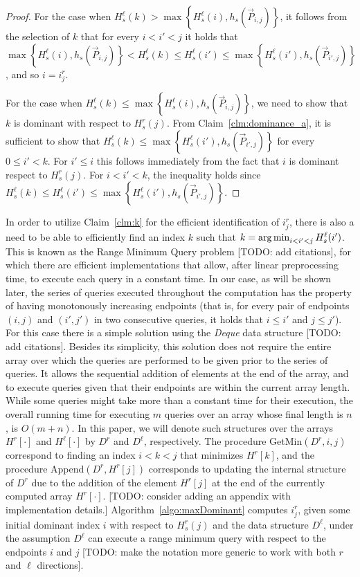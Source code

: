 \begin{proof}
	For the case when $H^\ell_s(k) > \max\left\{H^\ell_s(i), h_s(\vec{P}_{i, j})\right\}$, it follows from the selection of $k$ that for every $i < i' < j$ it holds that $\max\left\{H^\ell_s(i), h_s(\vec{P}_{i, j})\right\} < H^\ell_s(k) \leq H^\ell_s(i') \leq \max\left\{H^\ell_s(i'), h_s(\vec{P}_{i', j})\right\}$, and so $i = i^r_j$.
	
	For the case when $H^\ell_s(k) \leq \max\left\{H^\ell_s(i), h_s(\vec{P}_{i, j})\right\}$, we need to show that $k$ is dominant with respect to $H^r_s(j)$. From Claim~\ref{clm:dominance_a}, it is sufficient to show that $H^\ell_s(k) \leq \max\left\{H^\ell_s(i'), h_s(\vec{P}_{i', j})\right\}$ for every $0 \leq i' < k$. For $i' \leq i$ this follows immediately from the fact that $i$ is dominant respect to $H^r_s(j)$. For $i < i' < k$, the inequality holds since $H^\ell_s(k) \leq H^\ell_s(i') \leq \max\left\{H^\ell_s(i'), h_s(\vec{P}_{i', j})\right\}$.
\end{proof}

In order to utilize Claim~\ref{clm:k} for the efficient identification of $i^r_j$, there is also a need to be able to efficiently find an index $k$ such that $k = \operatorname*{arg\,min}_{i < i' < j} H^\ell_s(i')$. This is known as the Range Minimum Query problem [TODO: add citations], for which there are efficient implementations that allow, after linear preprocessing time, to execute each query in a constant time. In our case, as will be shown later, the series of queries executed throughout the computation has the property of having monotonously increasing endpoints (that is, for every pair of endpoints $(i, j)$ and $(i', j')$ in two consecutive queries, it holds that $i \leq i'$ and $j \leq j'$). For this case there is a simple solution using the \emph{Deque} data structure [TODO: add citations]. Besides its simplicity, this solution does not require the entire array over which the queries are performed to be given prior to the series of queries. It allows the sequential addition of elements at the end of the array, and to execute queries given that their endpoints are within the current array length. While some queries might take more than a constant time for their execution, the overall running time for executing $m$ queries over an array whose final length is $n$, is $O(m+n)$. In this paper, we will denote such structures over the arrays $H^r[\cdot]$ and $H^\ell[\cdot]$  by $D^r$ and $D^\ell$, respectively. The procedure GetMin$(D^r, i, j)$ correspond to finding an index $i < k < j$ that minimizes $H^r[k]$, and the procedure Append$(D^r, H^r[j])$ corresponds to updating the internal structure of $D^r$ due to the addition of the element $H^r[j]$ at the end of the currently computed array $H^r[\cdot]$. [TODO: consider adding an appendix with implementation details.] Algorithm~\ref{algo:maxDominant} computes $i^r_j$, given some initial dominant index $i$ with respect to $H^r_s(j)$ and the data structure $D^\ell$, under the assumption $D^\ell$ can execute a range minimum query with respect to the endpoints $i$ and $j$ [TODO: make the notation more generic to work with both $r$ and $\ell$ directions].

